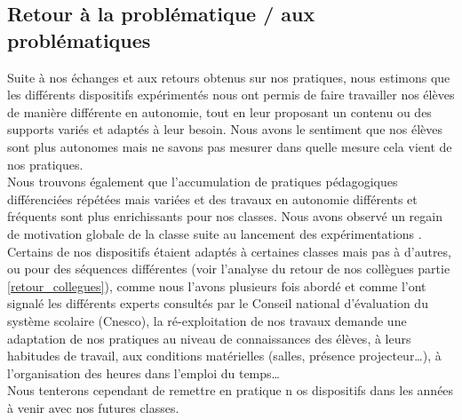 \subsection{Retour à la problématique / aux problématiques}
Suite à nos échanges et aux retours obtenus sur nos pratiques, nous estimons que les différents dispositifs expérimentés nous ont permis de faire travailler nos élèves de manière différente en autonomie, tout en leur proposant un contenu ou des supports variés et adaptés à leur besoin. Nous avons le sentiment que nos élèves sont plus autonomes mais ne savons pas mesurer dans quelle mesure cela vient de nos pratiques.\\
Nous trouvons également que l'accumulation de pratiques pédagogiques différenciées répétées mais variées et des travaux en autonomie différents et fréquents sont plus enrichissants pour nos classes. Nous avons observé un regain de motivation globale de la classe suite au lancement des expérimentations .\\
Certains de nos dispositifs étaient adaptés à certaines classes mais pas à d'autres, ou pour des séquences différentes (voir l'analyse du retour de nos collègues partie \ref{retour_collegues}), comme nous l'avons plusieurs fois abordé et comme l'ont signalé les différents experts consultés par le Conseil national d'évaluation du système scolaire (Cnesco)\cite{cnesco_synthese}\cite{cnesco_notes_experts}, la ré-exploitation de nos travaux demande une adaptation de nos pratiques au niveau de connaissances des élèves, à leurs habitudes de travail, aux conditions matérielles (salles, présence projecteur\ldots),  à l'organisation des heures dans l'emploi du temps\ldots\\
Nous tenterons cependant de remettre en pratique n os dispositifs dans les années à venir avec nos futures classes.
